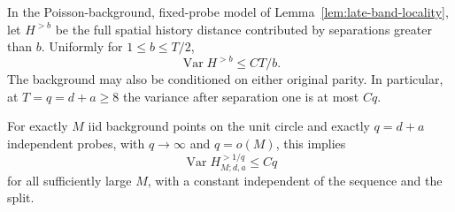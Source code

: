 \documentclass[11pt,letterpaper]{article}
\begin{document}
\begin{theorem}
\label{thm:late-history-variance}
In the Poisson-background, fixed-probe model of
Lemma~\ref{lem:late-band-locality}, let $H^{>b}$ be the full
spatial history distance contributed by separations greater
than $b$. Uniformly for $1\le b\le T/2$,
\begin{equation}\label{eq:late-history-variance}
 \operatorname{Var}H^{>b}\le CT/b.
\end{equation}
The background may also be conditioned on either original
parity. In particular, at $T=q=d+a\ge8$ the variance after
separation one is at most $Cq$.

For exactly $M$ iid background points on the unit circle
and exactly $q=d+a$ independent probes, with $q\to\infty$
and $q=o(M)$, this implies
\begin{equation}\label{eq:finite-late-history-variance}
 \operatorname{Var}H^{>1/q}_{M;d,a}\le Cq
\end{equation}
for all sufficiently large $M$, with a constant independent
of the sequence and the split.
\end{theorem}
\end{document}
